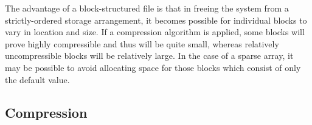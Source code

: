 \documentclass{article}
\begin{document}
The advantage of a block-structured file is that in freeing the system from
a strictly-ordered storage arrangement, it becomes possible for individual
blocks to vary in location and size.  If a compression algorithm is applied,
some blocks will prove highly compressible and thus will be quite small, 
whereas relatively uncompressible blocks will be relatively large.  In the
case of a sparse array, it may be possible to avoid allocating space for 
those blocks which consist of only the default value.

\subsection{Compression}
\end{document}
